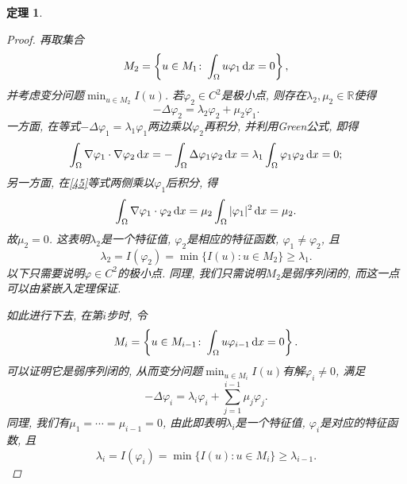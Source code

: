 \documentclass[12pt,a4paper]{article}
\newtheorem{theorem}{定理}[section]
\begin{document}
\begin{theorem}
\begin{proof}
        再取集合 
        \begin{equation*}
            M_2 = \left\{u \in M_1\colon \int_{\Omega}u\varphi_1 \,{\rm d}x = 0\right\},
        \end{equation*}
        并考虑变分问题$\min_{u \in M_2}I(u)$. 若$\varphi_2 \in C^2$是极小点, 则存在$\lambda_2, \mu_2 \in \mathbb{R}$使得 
        \begin{equation}\label{45}
            -\Delta\varphi_2 = \lambda_2\varphi_2 + \mu_2\varphi_1.
        \end{equation} 
        一方面, 在等式$-\Delta\varphi_1 = \lambda_1\varphi_1$两边乘以$\varphi_2$再积分, 并利用Green公式, 即得 
        \begin{equation*}
            \int_{\Omega}\nabla\varphi_1 \cdot \nabla\varphi_2 \,{\rm d}x = -\int_{\Omega}\Delta\varphi_1\varphi_2 \,{\rm d}x = \lambda_1\int_{\Omega}\varphi_1\varphi_2 \,{\rm d}x = 0;
        \end{equation*}
        另一方面, 在\eqref{45}等式两侧乘以$\varphi_1$后积分, 得 
        \begin{equation*}
            \int_{\Omega}\nabla\varphi_1 \cdot \varphi_2 \,{\rm d}x = \mu_2\int_{\Omega}|\varphi_1|^2 \,{\rm d}x = \mu_2.
        \end{equation*}
        故$\mu_2 = 0$. 这表明$\lambda_2$是一个特征值, $\varphi_2$是相应的特征函数, $\varphi_1 \neq \varphi_2$, 且 
        \begin{equation*}
            \lambda_2 = I(\varphi_2) = \min\{I(u)\colon u \in M_2\} \geq \lambda_1.
        \end{equation*}
        以下只需要说明$\varphi \in C^2$的极小点. 同理, 我们只需说明$M_2$是弱序列闭的, 而这一点可以由紧嵌入定理保证.

        如此进行下去, 在第$i$步时, 令 
        \begin{equation*}
            M_i = \left\{u \in M_{i - 1}\colon \int_{\Omega}u\varphi_{i - 1} \,{\rm d}x = 0\right\}.
        \end{equation*}
        可以证明它是弱序列闭的, 从而变分问题$\min_{u \in M_i}I(u)$有解$\varphi_i \neq 0$, 满足 
        \begin{equation*}
            -\Delta\varphi_i = \lambda_i\varphi_i + \sum_{j = 1}^{i - 1}\mu_j\varphi_j.
        \end{equation*}
        同理, 我们有$\mu_1 = \cdots = \mu_{i - 1} = 0$, 由此即表明$\lambda_i$是一个特征值, $\varphi_i$是对应的特征函数, 且 
        \begin{equation*}
            \lambda_i = I(\varphi_i) = \min\{I(u)\colon u \in M_i\} \geq \lambda_{i - 1}.
        \end{equation*}


\end{proof}
\end{theorem}
\end{document}
